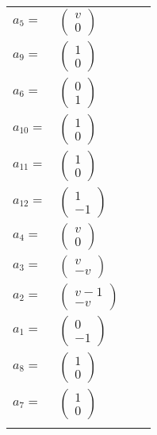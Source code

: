 \documentclass[1p]{elsarticle_modified}
\theoremstyle{definition}
\begin{document}
\begin{tabular}{m{7pt} m{180pt} m{7pt} m{180pt} }
\flushright $a_{5}=$&$\begin{pmatrix}v\\0\end{pmatrix}$ \\
\flushright $a_{9}=$&$\begin{pmatrix}1\\0\end{pmatrix}$ \\
\flushright $a_{6}=$&$\begin{pmatrix}0\\1\end{pmatrix}$ \\
\flushright $a_{10}=$&$\begin{pmatrix}1\\0\end{pmatrix}$ \\
\flushright $a_{11}=$&$\begin{pmatrix}1\\0\end{pmatrix}$ \\
\flushright $a_{12}=$&$\begin{pmatrix}1\\-1\end{pmatrix}$ \\
\flushright $a_{4}=$&$\begin{pmatrix}v\\0\end{pmatrix}$ \\
\flushright $a_{3}=$&$\begin{pmatrix}v\\- v\end{pmatrix}$ \\
\flushright $a_{2}=$&$\begin{pmatrix}v-1\\- v\end{pmatrix}$ \\
\flushright $a_{1}=$&$\begin{pmatrix}0\\-1\end{pmatrix}$ \\
\flushright $a_{8}=$&$\begin{pmatrix}1\\0\end{pmatrix}$ \\
\flushright $a_{7}=$&$\begin{pmatrix}1\\0\end{pmatrix}$\\&\end{tabular}
\end{document}
